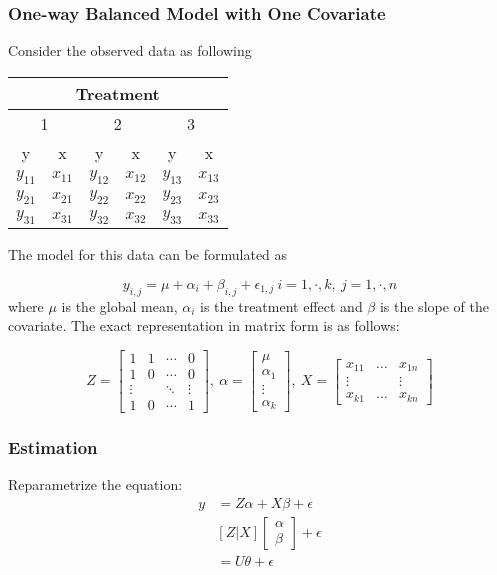 \documentclass[9pt]{article}
\begin{document}
\subsubsection{One-way Balanced Model with One Covariate}
Consider the observed data as following

\begin{center}
\begin{tabular}{ c c c c c c } 
\hline
\multicolumn{6}{c}{Treatment}\\
 \hline
 \multicolumn{2}{c}{1} & \multicolumn{2}{c}{2} & \multicolumn{2}{c}{3}\\
 y & x & y & x & y & x \\
 \hline
 $y_{11}$ & $x_{11}$ &  $y_{12}$ & $x_{12}$ &  $y_{13}$ & $x_{13}$\\
 $y_{21}$ & $x_{21}$ &  $y_{22}$ & $x_{22}$ &  $y_{23}$ & $x_{23}$\\
 $y_{31}$ & $x_{31}$ &  $y_{32}$ & $x_{32}$ &  $y_{33}$ & $x_{33}$\\
 \hline
\end{tabular}
\end{center}

The model for this data can be formulated as

$$
y_{i,j} = \mu + \alpha_{i} + \beta_{i,j} + \epsilon_{1,j}\ i=1,\cdot,k,\ j=1,\cdot,n
$$
where $\mu$ is the global mean, $\alpha_i$ is the treatment effect and $\beta$ is the slope of the covariate. The exact representation in matrix form is as follows:

$$
Z = \begin{bmatrix}1&1&\cdots&0\\1&0&\cdots&0\\\vdots&&\ddots&\vdots\\1&0&\cdots&1\end{bmatrix},\
\alpha=\begin{bmatrix}\mu\\ \alpha_1\\ \vdots\\ \alpha_k \end{bmatrix},\
X = \begin{bmatrix}
    x_{11} & \hdots & x_{1n}\\ \vdots & & \vdots\\ x_{k1} & \hdots & x_{kn}
\end{bmatrix}
$$

\subsubsection{Estimation}
Reparametrize the equation:
\begin{align*}
    y &= Z\alpha + X\beta + \epsilon\\
      & [Z|X]\begin{bmatrix}
          \alpha \\ \beta
      \end{bmatrix} + \epsilon\\
      &= U\theta + \epsilon
\end{align*}
\end{document}
